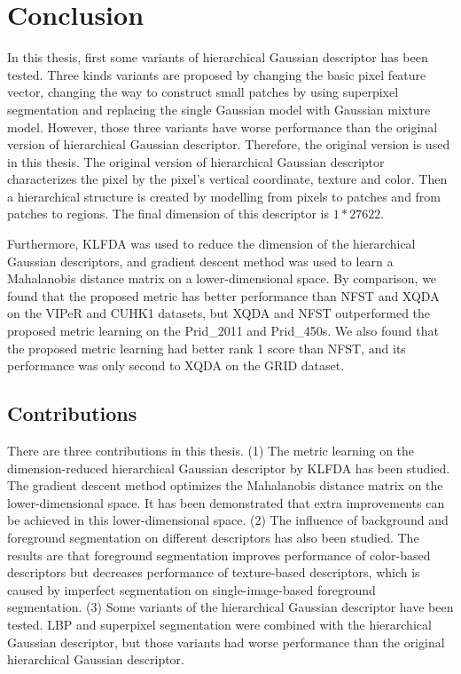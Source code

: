 
\chapter{Conclusion} %

In this thesis, first some variants of hierarchical Gaussian descriptor has been tested. Three kinds variants are proposed by changing the basic pixel feature vector, changing the way to construct small patches by using superpixel segmentation and replacing the single Gaussian model with Gaussian mixture model. However, those three variants have worse performance than the original version of hierarchical Gaussian descriptor. Therefore, the original version is used in this thesis. The original version of hierarchical Gaussian descriptor characterizes the pixel by the pixel's vertical coordinate, texture and color. Then a hierarchical structure is created by modelling from pixels to patches and from patches to regions. The final dimension of this descriptor is $1* 27622$.

Furthermore, KLFDA was used to reduce the dimension of the hierarchical Gaussian descriptors, and gradient descent method was used to learn a Mahalanobis distance matrix on a lower-dimensional space. By comparison, we found that the proposed metric has better performance than NFST and XQDA on the VIPeR and CUHK1 datasets, but XQDA and NFST outperformed the proposed metric learning on the Prid\_2011 and Prid\_450s. We also found that the proposed metric learning had better rank 1 score than NFST, and its performance was only second to XQDA on the GRID dataset. 


\section{Contributions}
There are three contributions in this thesis. (1) The metric learning on the dimension-reduced hierarchical Gaussian descriptor by KLFDA has been studied. The gradient descent method optimizes the Mahalanobis distance matrix on the lower-dimensional space. It has been demonstrated that extra improvements can be achieved in this lower-dimensional space. (2) The influence of background and foreground segmentation on different descriptors has also been studied. The results are that foreground segmentation improves performance of color-based descriptors but decreases performance of texture-based descriptors, which is caused by imperfect segmentation on single-image-based foreground segmentation. (3) Some variants of the hierarchical Gaussian descriptor have been tested. LBP and superpixel segmentation were combined with the hierarchical Gaussian descriptor, but those variants had worse performance than the original hierarchical Gaussian descriptor.

